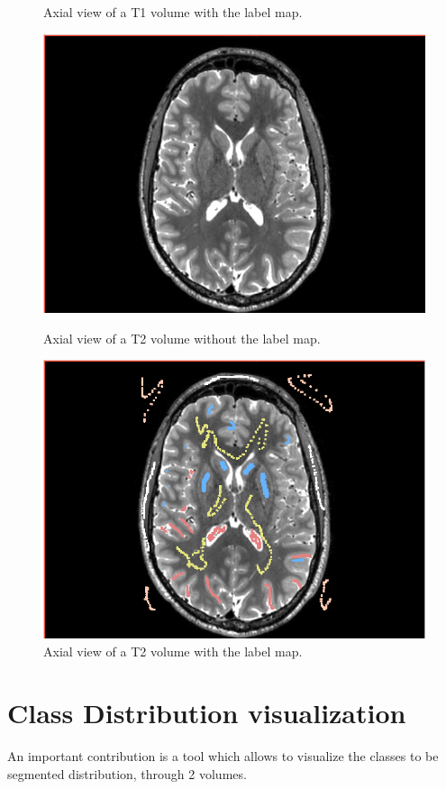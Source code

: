 \begin{figure}
\begin{minipage}[c]{.45\textwidth}
  \caption{Axial view of a T1 volume with the label map.}\label{fig:LabelT1}
\end{minipage}
\begin{minipage}[c]{.45\textwidth}\centering
  \includegraphics[width=.95\textwidth]{Images/Screenshots/T2ForLabel.png}
  \caption{Axial view of a T2 volume without the label map.}\label{fig:T2ForLabel}
\end{minipage}\hfill
\begin{minipage}[c]{.45\textwidth}\centering
  \includegraphics[width=.95\textwidth]{Images/Screenshots/LabelT2.png}
  \caption{Axial view of a T2 volume with the label map.}\label{fig:LabelT2}
\end{minipage}
\end{figure}
%
\section{Class Distribution visualization}\label{sec:tables}
An important contribution is a tool which allows to visualize the classes to be segmented distribution, through 2 volumes.
